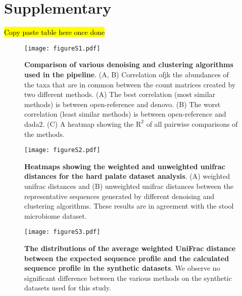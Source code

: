 
\newpage
\section*{Supplementary}

  \hl{Copy paste table here once done}

  \renewcommand{\thefigure}{S\arabic{figure}}
  \setcounter{figure}{0}

  \begin{figure}[h]
  \centering
  \texttt{[image: figureS1.pdf]}
  \caption{
    \textbf{Comparison of various denoising and clustering algorithms used in the pipeline}.
    (A, B) Correlation ofjk the abundances of the taxa that are in common between the count matrices created by two different methods.
    (A) The best correlation (most similar methods) is between open-reference and denovo.
    (B) The worst correlation (least similar methods) is between open-reference and dada2.
    (C) A heatmap showing the $\mathrm{R}^2$ of all pairwise comparisons of the methods.
  }
  \label{fig:figureS1}
\end{figure}

  \begin{figure}[h]
    \centering
    \texttt{[image: figureS2.pdf]}
    \caption{
      \textbf{Heatmaps showing the weighted and unweighted unifrac distances for the hard palate dataset analysis}.
      (A) weighted unifrac distances and (B) unweighted unifrac distances between the representative sequences generated by different denoising and clustering algorithms.
      These results are in agreement with the stool microbiome dataset.
    }
    \label{fig:figureS2}
  \end{figure}

  \begin{figure}[h]
    \centering
    \texttt{[image: figureS3.pdf]}
    \caption{
      \textbf{The distributions of the average weighted UniFrac distance between the expected sequence profile and the calculated sequence profile in the synthetic datasets}.
      We observe no significant difference between the various methods on the synthetic datasets used for this study.
    }
    \label{fig:figureS3}
  \end{figure}


